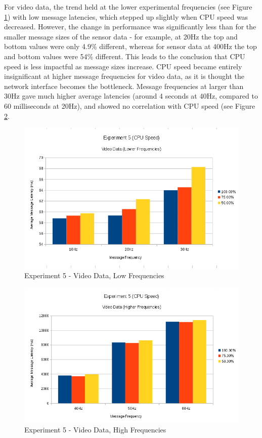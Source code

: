 \documentclass[../dissertation.tex]{subfiles}
\begin{document}
For video data, the trend held at the lower experimental frequencies (see Figure \ref{exp5-video-means-low-freq}) with low message latencies, which stepped up slightly when CPU speed was decreased. However, the change in performance was significantly less than for the smaller message sizes of the sensor data - for example, at 20Hz the top and bottom values were only 4.9\% different, whereas for sensor data at 400Hz the top and bottom values were 54\% different. This leads to the conclusion that CPU speed is less impactful as message sizes increase. CPU speed became entirely insignificant at higher message frequencies for video data, as it is thought the network interface becomes the bottleneck. Message frequencies at larger than 30Hz gave much higher average latencies (around 4 seconds at 40Hz, compared to 60 milliseconds at 20Hz), and showed no correlation with CPU speed (see Figure \ref{exp5-video-means-high-freq}.

\begin{figure}[H]
\centering
\includegraphics[width=\textwidth]{images/experiment5/video_data_low_freqs.png}
\caption{Experiment 5 - Video Data, Low Frequencies}
\label{exp5-video-means-low-freq}
\end{figure}

\begin{figure}[H]
\centering
\includegraphics[width=\textwidth]{images/experiment5/video_data_higher_freqs.png}
\caption{Experiment 5 - Video Data, High Frequencies}
\label{exp5-video-means-high-freq}
\end{figure}
\end{document}
